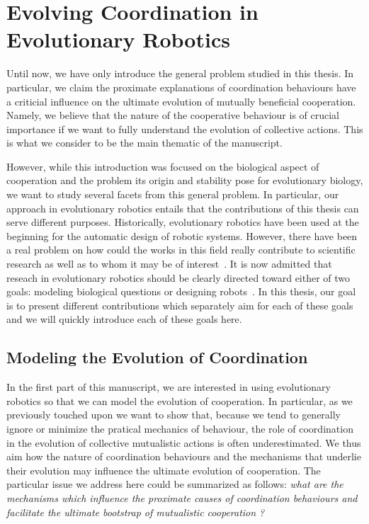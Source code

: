 \section{Evolving Coordination in Evolutionary Robotics}

  Until now, we have only introduce the general problem studied in this thesis. In particular, we claim the proximate explanations of coordination behaviours have a criticial influence on the ultimate evolution of mutually beneficial cooperation. Namely, we believe that the nature of the cooperative behaviour is of crucial importance if we want to fully understand the evolution of collective actions. This is what we consider to be the main thematic of the manuscript. 

  However, while this introduction was focused on the biological aspect of cooperation and the problem its origin and stability pose for evolutionary biology, we want to study several facets from this general problem. In particular, our approach in evolutionary robotics entails that the contributions of this thesis can serve different purposes. Historically, evolutionary robotics have been used at the beginning for the automatic design of robotic systems. However, there have been a real problem on how could the works in this field really contribute to scientific research as well as to whom it may be of interest~\parencite{Trianni2014b, Doncieux2015a}. It is now admitted that reseach in evolutionary robotics should be clearly directed toward either of two goals: modeling biological questions or designing robots~\parencite{Trianni2014b}. In this thesis, our goal is to present different contributions which separately aim for each of these goals and we will quickly introduce each of these goals here.

  
  \subsection{Modeling the Evolution of Coordination}

    In the first part of this manuscript, we are interested in using evolutionary robotics so that we can model the evolution of cooperation. In particular, as we previously touched upon we want to show that, because we tend to generally ignore or minimize the pratical mechanics of behaviour, the role of coordination in the evolution of collective mutualistic actions is often underestimated. We thus aim how the nature of coordination behaviours and the mechanisms that underlie their evolution may influence the ultimate evolution of cooperation. The particular issue we address here could be summarized as follows: \emph{what are the mechanisms which influence the proximate causes of coordination behaviours and facilitate the ultimate bootstrap of mutualistic cooperation ?}

